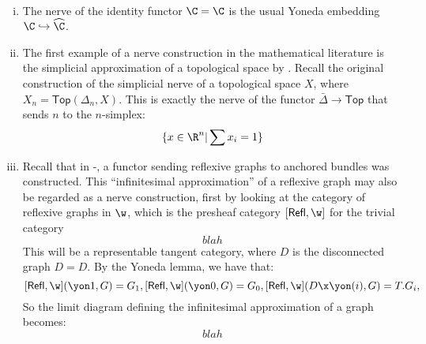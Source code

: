 \begin{example}%
	\label{ex:nerve-functors}
	~\begin{enumerate}[(i)]
		\item The nerve of the identity functor $\C = \C$ is the usual Yoneda embedding $\C \hookrightarrow \widehat{\C}$.
		\item 
		The first example of a nerve construction in the mathematical literature is the simplicial approximation of a topological space by \cite{Kan1958}.
		Recall the original construction of the simplicial nerve of a topological space $X$, where $X_n = \mathsf{Top}(\Delta_n,X)$.
		This is exactly the nerve of the functor $\bar{\Delta} \to \mathsf{Top}$ that sends $n$ to the $n$-simplex:
		\[
			\{
				x \in \R^n | \sum x_i = 1
			\}
		\]
		\item Recall that in -, a functor sending reflexive graphs to anchored bundles was constructed. This ``infinitesimal approximation'' of a reflexive graph may also be regarded as a nerve construction, first by looking at the category of reflexive graphs in $\w$, which is the presheaf category $[\mathsf{Refl}, \w]$ for the trivial category 
		\[
			blah %
		\]
		This will be a representable tangent category, where $D$ is the disconnected graph $D = D$. By the Yoneda lemma, we have that:
		\[
			[\mathsf{Refl}, \w](\yon 1, G) = G_1,
			[\mathsf{Refl}, \w](\yon 0, G) = G_0,
			[\mathsf{Refl}, \w](D \x \yon(i), G) = T.G_i,
		\]
		So the limit diagram defining the infinitesimal approximation of a graph becomes:
		\[
			blah %
		\]

	\end{enumerate}
\end{example}

